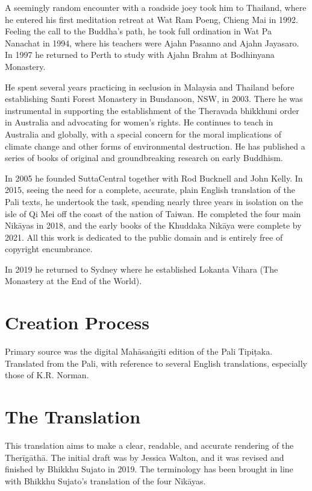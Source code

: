 \documentclass[12pt,openany]{book}%
\begin{document}
A seemingly random encounter with a roadside joey took him to Thailand, where he entered his first meditation retreat at Wat Ram Poeng, Chieng Mai in 1992. Feeling the call to the Buddha’s path, he took full ordination in Wat Pa Nanachat in 1994, where his teachers were Ajahn Pasanno and Ajahn Jayasaro. In 1997 he returned to Perth to study with Ajahn Brahm at Bodhinyana Monastery. 

He spent several years practicing in seclusion in Malaysia and Thailand before establishing Santi Forest Monastery in Bundanoon, NSW, in 2003. There he was instrumental in supporting the establishment of the Theravada bhikkhuni order in Australia and advocating for women’s rights. He continues to teach in Australia and globally, with a special concern for the moral implications of climate change and other forms of environmental destruction. He has published a series of books of original and groundbreaking research on early Buddhism. 

In 2005 he founded SuttaCentral together with Rod Bucknell and John Kelly. In 2015, seeing the need for a complete, accurate, plain English translation of the Pali texts, he undertook the task, spending nearly three years in isolation on the isle of Qi Mei off the coast of the nation of Taiwan. He completed the four main \textsanskrit{Nikāyas} in 2018, and the early books of the Khuddaka \textsanskrit{Nikāya} were complete by 2021. All this work is dedicated to the public domain and is entirely free of copyright encumbrance. 

In 2019 he returned to Sydney where he established Lokanta Vihara (The Monastery at the End of the World). 

\section*{Creation Process}

Primary source was the digital \textsanskrit{Mahāsaṅgīti} edition of the Pali \textsanskrit{Tipiṭaka}. Translated from the Pali, with reference to several English translations, especially those of K.R. Norman.

\section*{The Translation}

This translation aims to make a clear, readable, and accurate rendering of the \textsanskrit{Therīgāthā}. The initial draft was by Jessica Walton, and it was revised and finished by Bhikkhu Sujato in 2019. The terminology has been brought in line with Bhikkhu Sujato’s translation of the four \textsanskrit{Nikāyas}.
\end{document}
